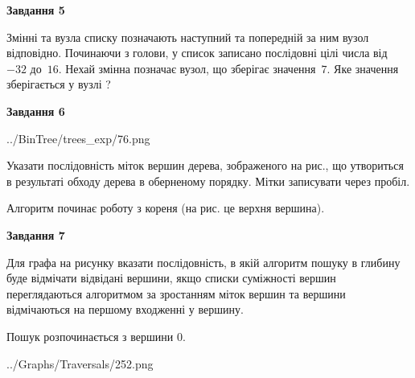 \documentclass[12pt, ukrainian]{article}
\begin{document}
{\begin {large}
{\begin {center}\textbf{Завдання 5}\end {center}}\par
Змінні  та  вузла списку позначають наступний та попередній за ним вузол відповідно. Починаючи з голови, у список записано послідовні цілі числа від~$-32$ до~$16$. Нехай змінна  позначає вузол, що зберігає значення~$7$.
Яке значення зберігається у вузлі  ?\par
\newpage

{\begin {center}\textbf{Завдання 6}\end {center}}\par

\begin{center}
	{../BinTree/trees_exp/76.png}
\end{center}
Указати послідовність міток вершин дерева, зображеного на рис., що утвориться в результаті обходу дерева в оберненому порядку. Мітки записувати через пробіл.\par Алгоритм починає роботу з кореня (на рис. це верхня вершина).\par
\newpage

{\begin {center}\textbf{Завдання 7}\end {center}}\par
Для графа на рисунку вказати послідовність, в якій алгоритм пошуку в глибину буде відмічати відвідані вершини, якщо списки суміжності вершин переглядаються алгоритмом за зростанням міток вершин та вершини відмічаються на першому вход\-женні у вершину.\par
Пошук розпочинається з вершини 0.\par

\begin{center}
	{../Graphs/Traversals/252.png}
\end{center}\par
\newpage


\end{large}}
\end{document}
